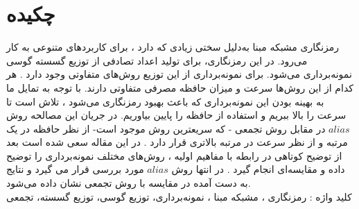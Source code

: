 \chapter*{چکیده}
رمزنگاری مشبکه مبنا به‌دلیل سختی زیادی که دارد ، برای کاربردهای متنوعی به کار می‌رود. در این رمزنگاری، برای تولید اعداد تصادفی از توزیع گسسته گوسی نمونه‌برداری می‌شود. برای نمونه‌برداری از این توزیع روش‌های متفاوتی وجود دارد . هر کدام از این روش‌ها سرعت و میزان حافظه مصرفی متفاوتی دارند. با توجه به تمایل ما به بهینه بودن این نمونه‌برداری که باعث بهبود رمزنگاری می‌شود ، تلاش است تا سرعت را بالا ببریم و استفاده از حافظه را پایین بیاوریم. در جریان این مصالحه روش $alias$ در مقابل روش تجمعی - که سریعترین روش موجود است- از نظر حافظه در یک مرتبه و از نظر سرعت در مرتبه بالاتری قرار دارد . در این مقاله سعی شده است بعد از توضیح کوتاهی در رابطه با مفاهیم اولیه ، روش‌های مختلف نمونه‌برداری را توضیح داده و مقایسه‌ای انجام گیرد . در انتها روش $alias$ مورد بررسی قرار می گیرد و نتایج به دست آمده در مقایسه با روش تجمعی نشان داده می‌شود. 
\\
کلید واژه : رمزنگاری ، مشبکه مبنا ، نمونه‌برداری، توزیع گوسی، توزیع گسسته، تجمعی